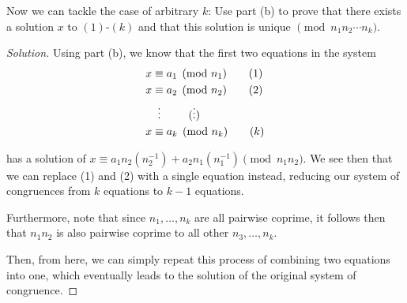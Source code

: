 \documentclass{article}
\newenvironment{solution}{\begin{proof}[Solution]}{\end{proof}}
\begin{document}
\begin{hw}
	Now we can tackle the case of arbitrary $k$: Use part (b) to prove that there exists
	a solution $x$ to $(1)$-$(k)$ and that this solution is unique $\pmod{n_1 n_2 \cdots n_k}$.
\end{hw}
\begin{solution}
	Using part (b), we know that the first two equations in the system 
	\begin{align*}
		x &\equiv a_1 \pmod{n_1} \tag{1} \\
		x &\equiv a_2 \pmod{n_2} \tag{2} \\
		&\vdotswithin{\equiv} \tag{$\vdots$} \\
		x &\equiv a_k \pmod{n_k} \tag{$k$}
	\end{align*}

	has a solution of $x \equiv a_{1}n_{2}(n^{-1}_{2}) + a_{2}n_{1}(n_{1}^{-1}) \pmod{n_{1}n_{2}}$. We see then that we can replace (1) and (2) with a single equation instead, reducing our system of congruences from $k$ equations to $k-1$ equations.
	
	Furthermore, note that since $n_{1}, \ldots, n_{k}$ are all pairwise coprime, it follows then that $n_{1}n_{2}$ is also pairwise coprime to all other $n_{3}, \ldots, n_{k}$.
	
	Then, from here, we can simply repeat this process of combining two equations into one, which eventually leads to the solution of the original system of congruence.
\end{solution}
\end{document}
